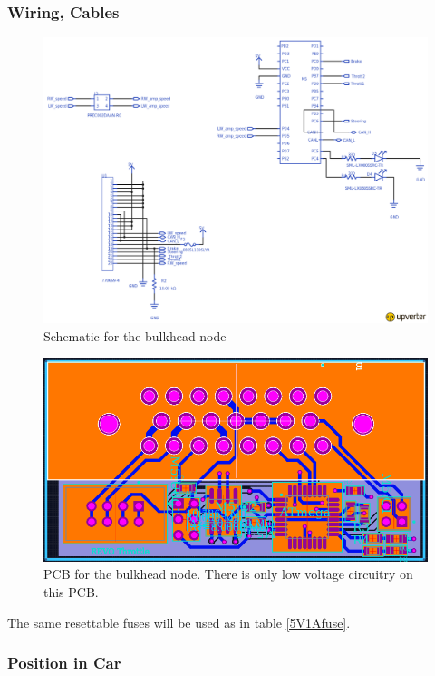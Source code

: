 \documentclass{article}
\begin{document}
{            \subsubsection{Wiring, Cables}

            \begin{figure}
                \includegraphics[width=\textheight]{throttleschem}
                \caption{Schematic for the bulkhead node}
                \label{throttleschem}
            \end{figure}

            \begin{figure}[H]
            \centering
            \includegraphics[width = 0.8 \textwidth]{throttlePCB}
            \caption{PCB for the bulkhead node. There is only low voltage circuitry on this PCB.}
            \label{throttlePCB}
            \end{figure}

            The same resettable fuses will be used as in table \ref{5V1Afuse}.

            \subsubsection{Position in Car}

}
\end{document}
